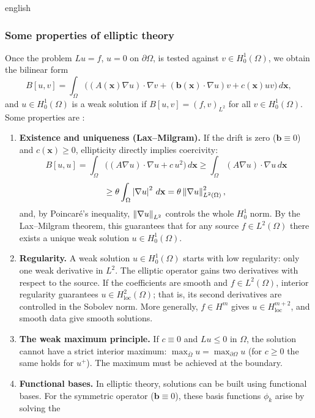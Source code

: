 \begin{hyphenrules}{english}
\subsubsection{Some properties of elliptic theory}
Once the problem $Lu=f$, $u=0$ on $\partial\Omega$, is tested against $v\in H^1_0(\Omega)$, we obtain
the bilinear form
\begin{equation}
  B[u,v]=\int_\Omega\Big((A(\mathbf{x})\nabla u)\cdot\nabla v+(\mathbf{b}(\mathbf{x})\cdot\nabla u)v+c(\mathbf{x})uv\Big)\,d\mathbf{x},
  \label{eq:elliptic-bilinear}
\end{equation}
and $u\in H^1_0(\Omega)$ is a weak solution if $B[u,v]=(f,v)_{L^2}$ for all $v\in H^1_0(\Omega)$. Some
properties are \cite{evans2010}:
\begin{enumerate}
  \item \textbf{Existence and uniqueness (Lax--Milgram).} If the drift is zero ($\mathbf{b}\equiv0$) and
    $c(\mathbf{x})\ge0$, ellipticity directly implies coercivity:
    \[
      B[u,u]=\int_\Omega\big((A\nabla u)\cdot\nabla u+c\,u^2\big)\,d\mathbf{x}
      \ge\int_\Omega(A\nabla u)\cdot\nabla u\,d\mathbf{x}
    \]
    \[
      \ge\theta\int_\Omega\left\lvert \nabla u \right\rvert^2\,d\mathbf{x}=\theta\left\lVert \nabla u \right\rVert_{L^2(\Omega)}^2,
    \]
    and, by Poincaré's inequality, $\left\lVert \nabla u \right\rVert_{L^2}$ controls the whole $H^1_0$ norm. By the
    Lax--Milgram theorem, this guarantees that for any source $f\in L^2(\Omega)$ there exists a unique
    weak solution $u\in H^1_0(\Omega)$.
  \item \textbf{Regularity.} A weak solution $u\in H^1_0(\Omega)$ starts with low regularity: only one
    weak derivative in $L^2$. The elliptic operator gains two derivatives with respect to the source. If
    the coefficients are smooth and $f\in L^2(\Omega)$, interior regularity guarantees
    $u\in H^2_{\mathrm{loc}}(\Omega)$; that is, its second derivatives are controlled in the Sobolev norm.
    More generally, $f\in H^m$ gives $u\in H^{m+2}_{\mathrm{loc}}$, and smooth data give smooth solutions.
  \item \textbf{The weak maximum principle.} If $c\equiv0$ and $Lu\le0$ in $\Omega$, the solution
    cannot have a strict interior maximum: $\max_{\bar\Omega}u=\max_{\partial\Omega}u$ (for $c\ge0$ the
    same holds for $u^+$). The maximum must be achieved at the boundary.
  \item \textbf{Functional bases.} In elliptic theory, solutions can be built using functional bases.
    For the symmetric operator ($\mathbf{b}\equiv0$), these basis functions $\phi_k$ arise by solving the

\end{enumerate}
\end{hyphenrules}
